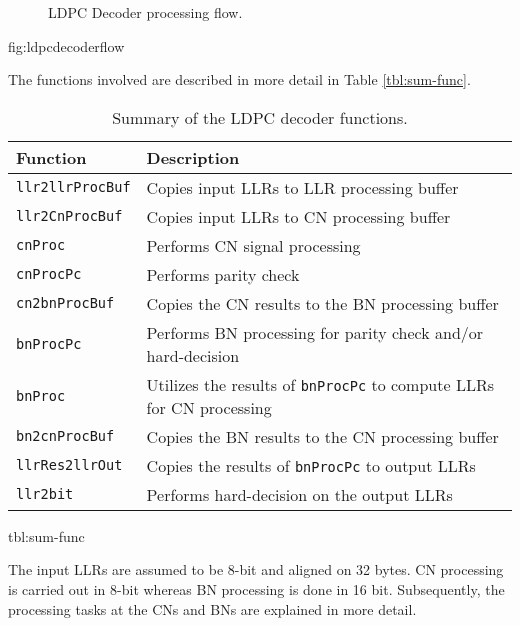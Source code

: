 \documentclass{article}
\begin{document}
\begin{figure}[ht]

  \caption{LDPC Decoder processing flow.}
\end{figure}{fig:ldpcdecoderflow}

The functions involved are described in more detail in Table \ref{tbl:sum-func}.

\begin{table}[ht]
  \centering
  \begin{tabular}{ll}
    \toprule
    \textbf{Function} & \textbf{Description} \\
    \midrule
    \texttt{llr2llrProcBuf} & Copies input LLRs to LLR processing buffer \\
    \texttt{llr2CnProcBuf}  & Copies input LLRs to CN  processing buffer \\
    \texttt{cnProc}         & Performs CN signal processing \\
    \texttt{cnProcPc}       & Performs parity check \\
    \texttt{cn2bnProcBuf}   & Copies the CN results to the BN processing buffer \\
    \texttt{bnProcPc}       & Performs BN processing for parity check and/or hard-decision \\
    \texttt{bnProc}         & Utilizes the results of \texttt{bnProcPc} to compute LLRs for CN processing \\
    \texttt{bn2cnProcBuf}   & Copies the BN results to the CN processing buffer \\
    \texttt{llrRes2llrOut}  & Copies the results of \texttt{bnProcPc} to output LLRs \\
    \texttt{llr2bit}        & Performs hard-decision on the output LLRs \\
    \bottomrule
  \end{tabular}
  \caption{Summary of the LDPC decoder functions.}
\end{table}{tbl:sum-func}

The input LLRs are assumed to be 8-bit and aligned on 32 bytes. CN processing is carried out in 8-bit whereas BN processing is done in 16 bit. Subsequently, the processing tasks at the CNs and BNs are explained in more detail.
\end{document}
